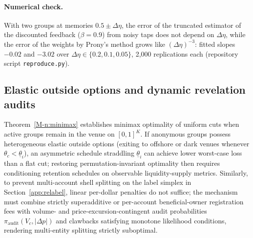 \documentclass[12pt]{article}
\theoremstyle{definition}
\theoremstyle{remark}
\begin{document}
\paragraph{Numerical check.} With two groups at memories $0.5\pm\Delta\eta$, the error of the truncated estimator of the discounted feedback ($\beta=0.9$) from noisy taps does not depend on $\Delta\eta$, while the error of the weights by Prony's method grows like $(\Delta\eta)^{-3}$: fitted slopes $-0.02$ and $-3.02$ over $\Delta\eta\in\{0.2,0.1,0.05\}$, 2,000 replications each (repository script \nolinkurl{reproduce.py}).


\subsection{Elastic outside options and dynamic revelation audits}\label{sec:elastic_exit}
Theorem~\ref{M-n:minimax} establishes minimax optimality of uniform cuts when active groups remain in the venue on $[0, 1]^K$. If anonymous groups possess heterogeneous elastic outside options (exiting to offshore or dark venues whenever $\theta_c < \underline{\theta}_i$), an asymmetric schedule straddling $\underline{\theta}_i$ can achieve lower worst-case loss than a flat cut; restoring permutation-invariant optimality then requires conditioning retention schedules on observable liquidity-supply metrics. Similarly, to prevent multi-account shell splitting on the label simplex in Section~\ref{app:relabel}, linear per-dollar penalties do not suffice; the mechanism must combine strictly superadditive or per-account beneficial-owner registration fees with volume- and price-excursion-contingent audit probabilities $\pi_{\mathrm{audit}}(V_c, |\Delta p|)$ and clawbacks satisfying \citet{border1987} monotone likelihood conditions, rendering multi-entity splitting strictly suboptimal.
\end{document}
